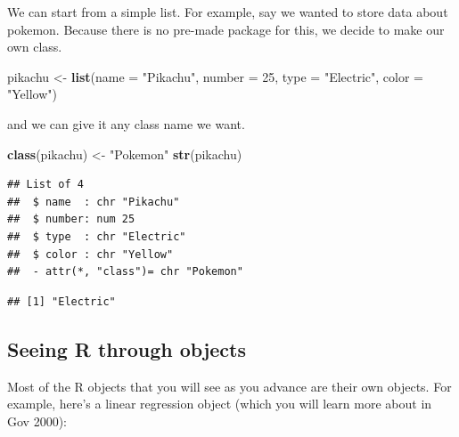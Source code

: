 \documentclass[
]{book}
\newenvironment{Shaded}{\begin{snugshade}}{\end{snugshade}}
\newcommand{\DataTypeTok}[1]{\textcolor[rgb]{0.13,0.29,0.53}{#1}}
\newcommand{\DecValTok}[1]{\textcolor[rgb]{0.00,0.00,0.81}{#1}}
\newcommand{\KeywordTok}[1]{\textcolor[rgb]{0.13,0.29,0.53}{\textbf{#1}}}
\newcommand{\NormalTok}[1]{#1}
\newcommand{\OperatorTok}[1]{\textcolor[rgb]{0.81,0.36,0.00}{\textbf{#1}}}
\newcommand{\StringTok}[1]{\textcolor[rgb]{0.31,0.60,0.02}{#1}}
\theoremstyle{definition}
\theoremstyle{definition}
\theoremstyle{definition}
\theoremstyle{definition}
\theoremstyle{remark}
\begin{document}
We can start from a simple list. For example, say we wanted to store data about pokemon. Because there is no pre-made package for this, we decide to make our own class.

\begin{Shaded}
\begin{Highlighting}[]
\NormalTok{pikachu <-}\StringTok{ }\KeywordTok{list}\NormalTok{(}\DataTypeTok{name =} \StringTok{"Pikachu"}\NormalTok{,}
                \DataTypeTok{number =} \DecValTok{25}\NormalTok{,}
                \DataTypeTok{type =} \StringTok{"Electric"}\NormalTok{,}
                \DataTypeTok{color =} \StringTok{"Yellow"}\NormalTok{)}
\end{Highlighting}
\end{Shaded}

and we can give it any class name we want.

\begin{Shaded}
\begin{Highlighting}[]
\KeywordTok{class}\NormalTok{(pikachu) <-}\StringTok{ "Pokemon"}
\KeywordTok{str}\NormalTok{(pikachu)}
\end{Highlighting}
\end{Shaded}

\begin{verbatim}
## List of 4
##  $ name  : chr "Pikachu"
##  $ number: num 25
##  $ type  : chr "Electric"
##  $ color : chr "Yellow"
##  - attr(*, "class")= chr "Pokemon"
\end{verbatim}

\begin{Shaded}
\end{Shaded}

\begin{verbatim}
## [1] "Electric"
\end{verbatim}

\hypertarget{seeing-r-through-objects}{%
\subsection{Seeing R through objects}\label{seeing-r-through-objects}}

Most of the R objects that you will see as you advance are their own objects. For example, here's a linear regression object (which you will learn more about in Gov 2000):
\end{document}
